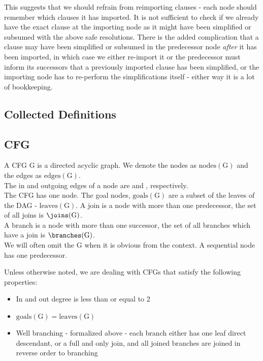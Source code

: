 This suggests that we should refrain from reimporting clauses - each node should remember which clauses it has imported.
It is not sufficient to check if we already have the exact clause at the importing node as it might have been simplified or subsumed with the above safe resolutions.
There is the added complication that a clause may have been simplified or subsumed in the predecessor node \emph{after} it has been imported, in which case we either re-import it or the predecessor must inform its successors that a previously imported clause has been simplified, or the importing node has to re-perform the simplifications itself - either way it is a lot of bookkeeping.

\subsection{Collected Definitions}
\subsection*{CFG}
A CFG $\mathrm{G}$ is a directed acyclic graph. We denote the nodes as $\mathrm{nodes}(\mathrm{G})$ and the edges as $\mathrm{edges}(\mathrm{G})$.\\
The in and outgoing edges of a node  are  and , respectively.\\
The CFG has one  node.
The goal nodes, $\mathrm{goals}(\mathrm{G})$ are a subset of the leaves of the DAG - $\mathrm{leaves}(\mathrm{G})$.
A join is a node with more than one predecessor, the set of all joins is $\joins(\mathrm{G})$.\\
A branch is a node with more than one successor, the set of all branches which have a join is $\branches(\mathrm{G})$.\\
We will often omit the $\mathrm{G}$ when it is obvious from the context.
A sequential node has one predecessor.

Unless otherwise noted, we are dealing with CFGs that satisfy the following properties:
\begin{itemize}
	\item In and out degree is less than or equal to 2
	\item $\mathrm{goals}(\mathrm{G})=\mathrm{leaves}(\mathrm{G})$
	\item Well branching - formalized above - each branch either has one leaf direct descendant, or a full and only join, and all joined branches are joined in reverse order to branching
\end{itemize}

